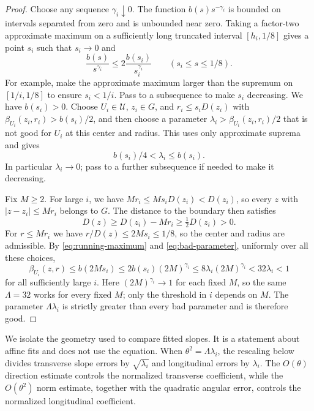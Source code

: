 \begin{proof}
Choose any sequence $\gamma_i\downarrow0$. The function $b(s)s^{-\gamma_i}$ is bounded on intervals separated from zero and is unbounded near zero. Taking a factor-two approximate maximum on a sufficiently long truncated interval $[h_i,1/8]$ gives a point $s_i$ such that $s_i\to0$ and
\begin{equation}\label{eq:running-maximum}
  \frac{b(s)}{s^{\gamma_i}}
     \le2\frac{b(s_i)}{s_i^{\gamma_i}}\qquad(s_i\le s\le1/8).
\end{equation}
For example, make the approximate maximum larger than the supremum on $[1/i,1/8]$ to ensure $s_i<1/i$. Pass to a subsequence to make $s_i$ decreasing. We have $b(s_i)>0$. Choose $U_i\in\mathcal U$, $z_i\in G$, and $r_i\le s_iD(z_i)$ with $\beta_{U_i}(z_i,r_i)>b(s_i)/2$, and then choose a parameter $\lambda_i>\beta_{U_i}(z_i,r_i)/2$ that is not good for $U_i$ at this center and radius. This uses only approximate suprema and gives
\begin{equation}\label{eq:bad-parameter}
  b(s_i)/4<\lambda_i\le b(s_i).
\end{equation}
In particular $\lambda_i\to0$; pass to a further subsequence if needed to make it decreasing.

Fix $M\ge2$. For large $i$, we have $Mr_i\le Ms_iD(z_i)<D(z_i)$, so every $z$ with $|z-z_i|\le Mr_i$ belongs to $G$. The distance to the boundary then satisfies
\[
  D(z)\ge D(z_i)-Mr_i\ge\tfrac12D(z_i)>0.
\]
For $r\le Mr_i$ we have $r/D(z)\le2Ms_i\le1/8$, so the center and radius are admissible. By \eqref{eq:running-maximum} and \eqref{eq:bad-parameter}, uniformly over all these choices,
\[
  \beta_{U_i}(z,r)\le b(2Ms_i)
     \le2b(s_i)(2M)^{\gamma_i}
     \le8\lambda_i(2M)^{\gamma_i}
     <32\lambda_i<1
\]
for all sufficiently large $i$. Here $(2M)^{\gamma_i}\to1$ for each fixed $M$, so the same $\Lambda=32$ works for every fixed $M$; only the threshold in $i$ depends on $M$. The parameter $\Lambda\lambda_i$ is strictly greater than every bad parameter and is therefore good.
\end{proof}

We isolate the geometry used to compare fitted slopes. It is a statement about affine fits and does not use the equation. When $\theta^2=\Lambda\lambda_i$, the rescaling below divides transverse slope errors by $\sqrt{\lambda_i}$ and longitudinal errors by $\lambda_i$. The $O(\theta)$ direction estimate controls the normalized transverse coefficient, while the $O(\theta^2)$ norm estimate, together with the quadratic angular error, controls the normalized longitudinal coefficient.

